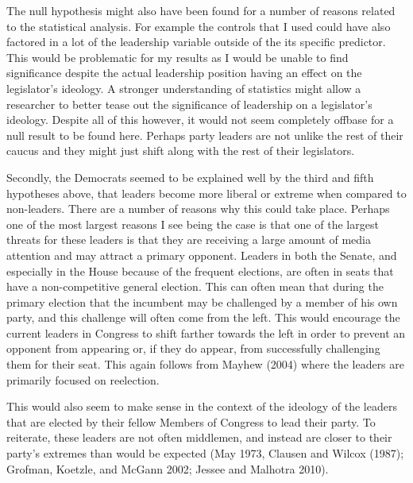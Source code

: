 \documentclass[12pt,twoside]{reedthesis}
\begin{document}
  The null hypothesis might also have been found for a number of reasons
  related to the statistical analysis. For example the controls that I
  used could have also factored in a lot of the leadership variable
  outside of the its specific predictor. This would be problematic for my
  results as I would be unable to find significance despite the actual
  leadership position having an effect on the legislator's ideology. A
  stronger understanding of statistics might allow a researcher to better
  tease out the significance of leadership on a legislator's ideology.
  Despite all of this however, it would not seem completely offbase for a
  null result to be found here. Perhaps party leaders are not unlike the
  rest of their caucus and they might just shift along with the rest of
  their legislators.
  
  Secondly, the Democrats seemed to be explained well by the third and
  fifth hypotheses above, that leaders become more liberal or extreme when
  compared to non-leaders. There are a number of reasons why this could
  take place. Perhaps one of the most largest reasons I see being the case
  is that one of the largest threats for these leaders is that they are
  receiving a large amount of media attention and may attract a primary
  opponent. Leaders in both the Senate, and especially in the House
  because of the frequent elections, are often in seats that have a
  non-competitive general election. This can often mean that during the
  primary election that the incumbent may be challenged by a member of his
  own party, and this challenge will often come from the left. This would
  encourage the current leaders in Congress to shift farther towards the
  left in order to prevent an opponent from appearing or, if they do
  appear, from successfully challenging them for their seat. This again
  follows from Mayhew (2004) where the leaders are primarily focused on
  reelection.
  
  This would also seem to make sense in the context of the ideology of the
  leaders that are elected by their fellow Members of Congress to lead
  their party. To reiterate, these leaders are not often middlemen, and
  instead are closer to their party's extremes than would be expected (May
  1973, Clausen and Wilcox (1987); Grofman, Koetzle, and McGann 2002;
  Jessee and Malhotra 2010).
  
\end{document}
